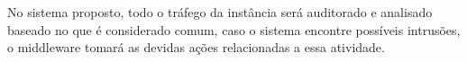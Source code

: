 \documentclass[journal]{IEEEtran}
\begin{document}
No sistema proposto, todo o tráfego da instância será auditorado e analisado baseado no que é considerado comum, caso o sistema encontre possíveis intrusões, o middleware tomará as devidas ações relacionadas a essa atividade.

\end{document}
